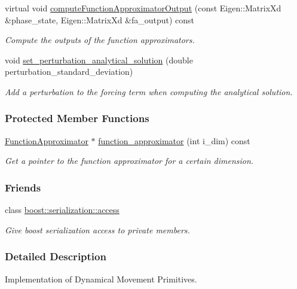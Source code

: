 \begin{DoxyCompactItemize}
virtual void \hyperlink{classDmpBbo_1_1Dmp_a89078b732a4579130e24e3bc59c1713c}{compute\+Function\+Approximator\+Output} (const Eigen\+::\+Matrix\+Xd \&phase\+\_\+state, Eigen\+::\+Matrix\+Xd \&fa\+\_\+output) const 
\begin{DoxyCompactList}\small\item\em Compute the outputs of the function approximators. \end{DoxyCompactList}\item 
void \hyperlink{classDmpBbo_1_1Dmp_a6c44c534fd7bb0b6ad87648692e15269}{set\+\_\+perturbation\+\_\+analytical\+\_\+solution} (double perturbation\+\_\+standard\+\_\+deviation)
\begin{DoxyCompactList}\small\item\em Add a perturbation to the forcing term when computing the analytical solution. \end{DoxyCompactList}\end{DoxyCompactItemize}
\subsubsection*{Protected Member Functions}
\begin{DoxyCompactItemize}
\item 
\hyperlink{classDmpBbo_1_1FunctionApproximator}{Function\+Approximator} $\ast$ \hyperlink{classDmpBbo_1_1Dmp_ac428e2dd848c99ddaf517f2dbacdf3ad}{function\+\_\+approximator} (int i\+\_\+dim) const 
\begin{DoxyCompactList}\small\item\em Get a pointer to the function approximator for a certain dimension. \end{DoxyCompactList}\end{DoxyCompactItemize}
\subsubsection*{Friends}
\begin{DoxyCompactItemize}
\item 
class \hyperlink{classDmpBbo_1_1Dmp_ac98d07dd8f7b70e16ccb9a01abf56b9c}{boost\+::serialization\+::access}
\begin{DoxyCompactList}\small\item\em Give boost serialization access to private members. \end{DoxyCompactList}\end{DoxyCompactItemize}


\subsubsection{Detailed Description}
Implementation of Dynamical Movement Primitives. 


